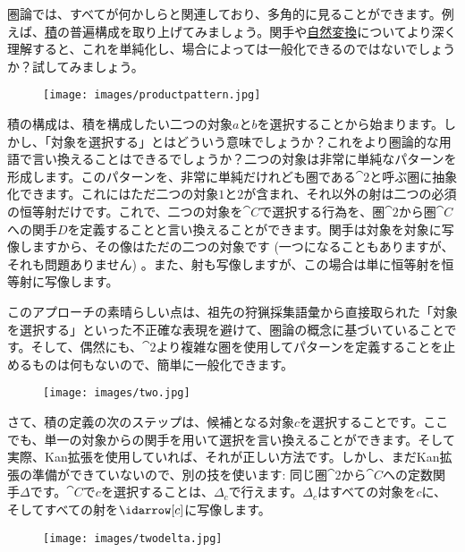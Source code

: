 
\lettrine[lhang=0.17]{圏}{論}では、すべてが何かしらと関連しており、多角的に見ることができます。例えば、\hyperref[products-and-coproducts]{積}の普遍構成を取り上げてみましょう。関手や\hyperref[natural-transformations]{自然変換}についてより深く理解すると、これを単純化し、場合によっては一般化できるのではないでしょうか？試してみましょう。

\begin{figure}[H]
  \centering
  \texttt{[image: images/productpattern.jpg]}
\end{figure}

\noindent
積の構成は、積を構成したい二つの対象$a$と$b$を選択することから始まります。しかし、「対象を選択する」とはどういう意味でしょうか？これをより圏論的な用語で言い換えることはできるでしょうか？二つの対象は非常に単純なパターンを形成します。このパターンを、非常に単純だけれども圏である$\cat{2}$と呼ぶ圏に抽象化できます。これにはただ二つの対象$1$と$2$が含まれ、それ以外の射は二つの必須の恒等射だけです。これで、二つの対象を$\cat{C}$で選択する行為を、圏$\cat{2}$から圏$\cat{C}$への関手$D$を定義することと言い換えることができます。関手は対象を対象に写像しますから、その像はただの二つの対象です (一つになることもありますが、それも問題ありません) 。また、射も写像しますが、この場合は単に恒等射を恒等射に写像します。

このアプローチの素晴らしい点は、祖先の狩猟採集語彙から直接取られた「対象を選択する」といった不正確な表現を避けて、圏論の概念に基づいていることです。そして、偶然にも、$\cat{2}$より複雑な圏を使用してパターンを定義することを止めるものは何もないので、簡単に一般化できます。

\begin{figure}[H]
  \centering
  \texttt{[image: images/two.jpg]}
\end{figure}

\noindent
さて、積の定義の次のステップは、候補となる対象$c$を選択することです。ここでも、単一の対象からの関手を用いて選択を言い換えることができます。そして実際、Kan拡張を使用していれば、それが正しい方法です。しかし、まだKan拡張の準備ができていないので、別の技を使います: 同じ圏$\cat{2}$から$\cat{C}$への定数関手$\Delta$です。$\cat{C}$で$c$を選択することは、$\Delta_c$で行えます。$\Delta_c$はすべての対象を$c$に、そしてすべての射を$\idarrow[c]$に写像します。

\begin{figure}[H]
  \centering
  \texttt{[image: images/twodelta.jpg]}
\end{figure}


